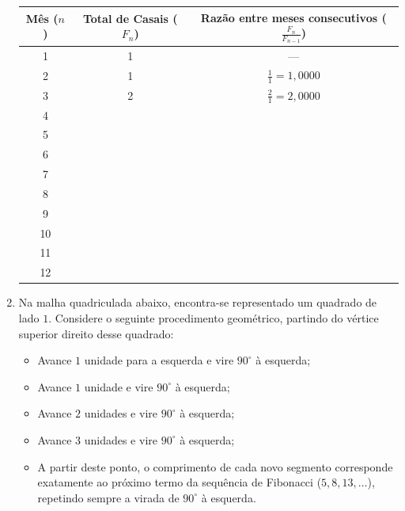 \documentclass[12pt,a4paper]{article}
\begin{document}
\begin{enumerate}
		\begin{table}[h!]
			\centering
			\renewcommand{\arraystretch}{1.4} %
			\begin{tabular}{|c|c|c|}
				\hline
				\textbf{Mês ($n$)} & \textbf{Total de Casais ($F_n$)} & \textbf{Razão entre meses consecutivos ($\frac{F_n}{F_{n-1}}$)} \\ \hline
				1  & 1   & --- \\ \hline
				2  & 1   & $\frac{1}{1} = 1{,}0000$ \\ \hline
				3  & 2   & $\frac{2}{1} = 2{,}0000$ \\ \hline
				4  &    & \\ \hline
				5  &    & \\ \hline
				6  &    & \\ \hline
				7  &   & \\ \hline
				8  &   & \\ \hline
				9  &   & \\ \hline
				10 &  & \\ \hline
				11 &  & \\ \hline
				12 &  & \\ \hline
			\end{tabular}
		\end{table}
	
	\newpage
	\item Na malha quadriculada abaixo, encontra-se representado um quadrado de lado $1$. Considere o seguinte procedimento geométrico, partindo do vértice superior direito desse quadrado:
	
	\begin{itemize}
		\item Avance $1$ unidade para a esquerda e vire $90^\circ$ à esquerda;
		\item Avance $1$ unidade e vire $90^\circ$ à esquerda;
		\item Avance $2$ unidades e vire $90^\circ$ à esquerda;
		\item Avance $3$ unidades e vire $90^\circ$ à esquerda;
		\item A partir deste ponto, o comprimento de cada novo segmento corresponde exatamente ao próximo termo da sequência de Fibonacci ($5, 8, 13, \dots$), repetindo sempre a virada de $90^\circ$ à esquerda.
	\end{itemize}



\end{enumerate}
\end{document}
